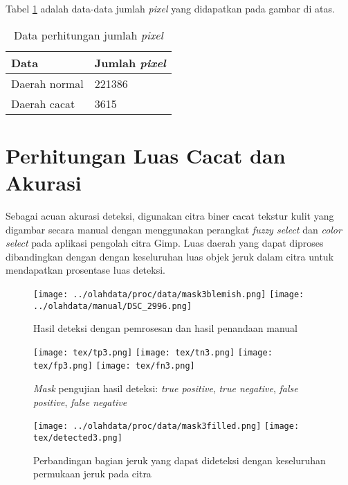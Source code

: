 \documentclass[laporan.tex]{subfiles}
\begin{document}

Tabel \ref{table:pixelcountexample} adalah data-data jumlah \emph{pixel} yang didapatkan pada gambar di atas.

\begin{table}[h!]
\centering
\begin{tabular}{|l|l|}
\hline
Data & Jumlah \emph{pixel} \\
\hline
Daerah normal & 221386 \\
Daerah cacat & 3615 \\
\hline
\end{tabular}
\caption{Data perhitungan jumlah \emph{pixel}}
\label{table:pixelcountexample}
\end{table}

\section{Perhitungan Luas Cacat dan Akurasi}

Sebagai acuan akurasi deteksi, digunakan citra biner cacat tekstur kulit yang digambar secara manual dengan menggunakan perangkat \emph{fuzzy select} dan \emph{color select} pada aplikasi pengolah citra Gimp. Luas daerah yang dapat diproses dibandingkan dengan dengan keseluruhan luas objek jeruk dalam citra untuk mendapatkan prosentase luas deteksi.

\begin{figure}[h!]
\centering
\texttt{[image: ../olahdata/proc/data/mask3blemish.png]} \qquad
\texttt{[image: ../olahdata/manual/DSC\_2996.png]}
\caption{Hasil deteksi dengan pemrosesan dan hasil penandaan manual}
\end{figure}

\begin{figure}[h!]
\centering
\texttt{[image: tex/tp3.png]} \qquad
\texttt{[image: tex/tn3.png]} \vskip 0.5cm
\texttt{[image: tex/fp3.png]} \qquad
\texttt{[image: tex/fn3.png]}
\caption{\emph{Mask} pengujian hasil deteksi: \emph{true positive}, \emph{true negative}, \emph{false positive}, \emph{false negative}}
\end{figure}

\begin{figure}[h!]
\centering
\texttt{[image: ../olahdata/proc/data/mask3filled.png]} \qquad
\texttt{[image: tex/detected3.png]}
\caption{Perbandingan bagian jeruk yang dapat dideteksi dengan keseluruhan permukaan jeruk pada citra}
\end{figure}
\end{document}
